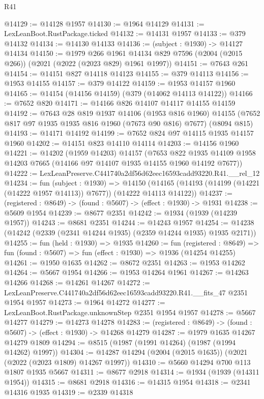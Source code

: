 \begin{lexlean}{R41}
\begin{coremodule}
@14129 := @14128 @1957
@14130 := @1964 @14129
@14131 := LexLeanBoot.RustPackage.ticked
@14132 := @14131 @1957
@14133 := @379 @14132
@14134 := @14130 @14133
@14136 := (subject : @1930) -> @14127 @14134
@14150 := @1979
    @266
    @1961
    @14134
    @829
    @7596
    (@2004 (@2015 @266))
    (@2021 (@2022 (@2023 @829) @1961 @1997))
@14151 := @7643 @261
@14154 := @14151 @827 @14118 @14123
@14155 := @379 @14113
@14156 := @1953 @14155
@14157 := @379 @14122
@14159 := @1953 @14157 @1960
@14165 := @14154 (@14156 @14159) (@379 (@14062 @14113 @14122))
@14166 := @7652 @820
@14171 := @14166 @826 @14107 @14117 @14155 @14159
@14192 := @7643
    @28
    @819
    @1937
    @14106
    (@1953 @816 @1960)
    @14155
    (@7652 @817 @97 @1935 @1935 @816 @1960 (@7673 @90 @816) @7677)
    (@8094 @815)
@14193 := @14171 @14192
@14199 := @7652 @824 @97 @14115 @1935 @14157 @1960
@14202 := @14151 @823 @14110 @14114
@14203 := @14156 @1960
@14221 := @14202
    (@1959 @14203)
    @14157
    (@7653 @822 @1935 @14109 @1958 @14203 @7665 (@14166 @97 @14107 @1935 @14155 @1960 @14192 @7677))
@14222 := LexLeanPreserve.C441740a2df56d62eec16593cadd93220.R41.__rel_12
@14234 := fun (subject : @1930) =>
  @14150 (@14165 (@14193 (@14199 (@14221 (@14222 @1957 @14113)) @7677)) (@14222 @14113 @14122))
@14237 := (registered : @8649) -> (found : @5607) -> (effect : @1930) -> @1931
@14238 := @5609 @1954
@14239 := @8677 @2351
@14242 := @1934 (@1939 (@14239 @1957))
@14243 := @8681 @2351
@14244 := @14243 @1957
@14254 := @14238 (@14242 (@2339 (@2341 @14244 @1935) (@2359 @14244 @1935) @1935 @2171))
@14255 := fun (held : @1930) => @1935
@14260 := fun (registered : @8649) =>
  fun (found : @5607) => fun (effect : @1930) => @1936 (@14254 @14255)
@14261 := @1950 @1635
@14262 := @8672 @2351
@14263 := @1953 @14262
@14264 := @5667 @1954
@14266 := @1953 @14264 @1961
@14267 := @14263 @14266
@14268 := @14261 @14267
@14272 := LexLeanPreserve.C441740a2df56d62eec16593cadd93220.R41.__fits_47 @2351 @1954 @1957
@14273 := @1964 @14272
@14277 := LexLeanBoot.RustPackage.unknownStep @2351 @1954 @1957
@14278 := @5667 @14277
@14279 := @14273 @14278
@14283 := (registered : @8649) -> (found : @5607) -> (effect : @1930) -> @14268 @14279
@14287 := @1979 @1635 @14267 @14279 @1809
@14294 := @8515 (@1987 (@1991 @14264) (@1987 (@1994 @14262) @1997))
@14304 := @14287 @14294 (@2004 (@2015 @1635)) (@2021 (@2022 (@2023 @1809) @14267 @1997))
@14310 := @5660 @14294 @700 @113 @1807 @1935 @5667
@14311 := @8677 @2918
@14314 := @1934 (@1939 (@14311 @1954))
@14315 := @8681 @2918
@14316 := @14315 @1954
@14318 := @2341 @14316 @1935
@14319 := @2339 @14318

\end{coremodule}
\end{lexlean}
